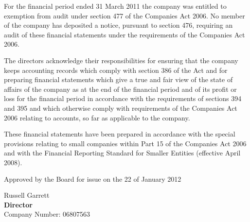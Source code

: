 {\footnotesize For the financial period ended 31 March 2011 the
company was entitled to exemption from audit under section 477 of the
Companies Act 2006. No member of the company has deposited a
notice, pursuant to section 476, requiring an audit of these
financial statements under the requirements of the Companies Act
2006.

The directors acknowledge their responsibilities for ensuring that
the company keeps accounting records which comply with section 386
of the Act and for preparing financial statements which give a true
and fair view of the state of affairs of the company as at the end
of the financial period and of its profit or loss for the financial
period in accordance with the requirements of sections 394 and 395
and which otherwise comply with requirements of the Companies Act
2006 relating to accounts, so far as applicable to the company.

These financial statements have been prepared in accordance with
the special provisions relating to small companies within Part 15
of the Companies Act 2006 and with the Financial Reporting Standard
for Smaller Entities (effective April 2008).}

\vfill

Approved by the Board for issue on the 22 of January 2012
\vspace{48pt}

Russell Garrett \\
{\bf Director} \\
Company Number: 06807563
